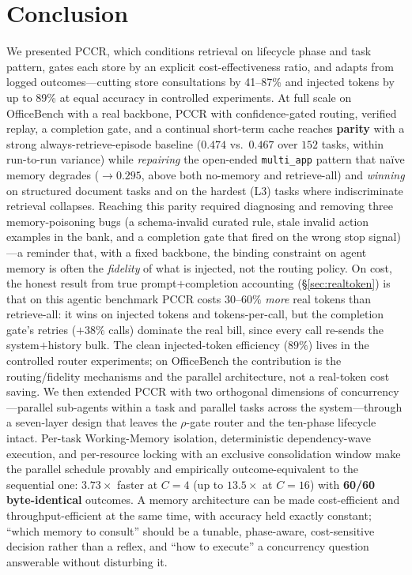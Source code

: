 \documentclass[10pt,twocolumn]{article}
\newcommand{\code}[1]{\texttt{\small #1}}
\begin{document}
\section{Conclusion}
We presented PCCR, which conditions retrieval on lifecycle phase and task pattern,
gates each store by an explicit cost-effectiveness ratio, and adapts from logged
outcomes---cutting store consultations by 41--87\% and injected tokens by up to 89\%
at equal accuracy in controlled experiments. At full scale on OfficeBench with a real
backbone, PCCR with confidence-gated routing, verified replay, a completion gate, and a
continual short-term cache reaches \textbf{parity} with a strong always-retrieve-episode
baseline ($0.474$ vs.\ $0.467$ over $152$ tasks, within run-to-run variance) while
\emph{repairing} the open-ended \code{multi\_app} pattern that na\"ive memory degrades
($\to0.295$, above both no-memory and retrieve-all) and \emph{winning} on structured
document tasks and on the hardest (L3) tasks where indiscriminate retrieval collapses.
Reaching this parity required diagnosing and removing three memory-poisoning bugs (a
schema-invalid curated rule, stale invalid action examples in the bank, and a completion
gate that fired on the wrong stop signal)---a reminder that, with a fixed backbone, the
binding constraint on agent memory is often the \emph{fidelity} of what is injected, not
the routing policy. On cost, the honest result from true prompt$+$completion
accounting (\S\ref{sec:realtoken}) is that on this agentic benchmark PCCR costs $30$--$60\%$
\emph{more} real tokens than retrieve-all: it wins on injected tokens and tokens-per-call, but the
completion gate's retries ($+38\%$ calls) dominate the real bill, since every call re-sends the
system$+$history bulk. The clean injected-token efficiency ($89\%$) lives in the controlled router
experiments; on OfficeBench the contribution is the routing/fidelity mechanisms and the parallel
architecture, not a real-token cost saving. We then extended PCCR with two orthogonal dimensions of
concurrency---parallel sub-agents within a task and parallel tasks across the
system---through a seven-layer design that leaves the $\rho$-gate router and the
ten-phase lifecycle intact. Per-task Working-Memory isolation, deterministic
dependency-wave execution, and per-resource locking with an exclusive consolidation
window make the parallel schedule provably and empirically outcome-equivalent to
the sequential one: $3.73\times$ faster at $C{=}4$ (up to $13.5\times$ at $C{=}16$)
with \textbf{60/60 byte-identical} outcomes. A memory architecture can be made
cost-efficient and throughput-efficient at the same time, with accuracy held
exactly constant; ``which memory to consult'' should be a tunable, phase-aware,
cost-sensitive decision rather than a reflex, and ``how to execute'' a concurrency
question answerable without disturbing it.
\end{document}
